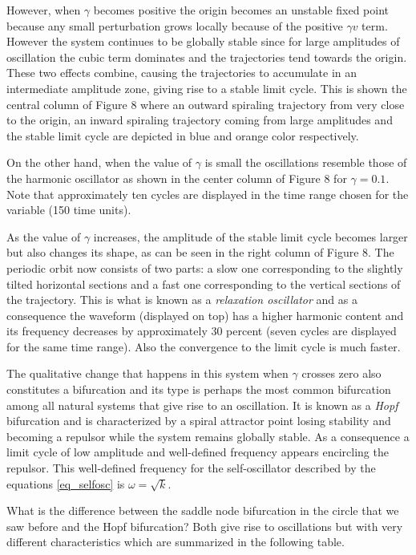 \documentclass{article}
\begin{document}
However, when $\gamma$ becomes positive the origin becomes an unstable fixed point because any small perturbation grows locally because of the positive $
\gamma v$ term. 
However the system continues to be globally stable since for large amplitudes of oscillation the cubic term dominates and the trajectories tend towards the origin. 
These two effects combine, causing the trajectories to accumulate in an intermediate amplitude zone, giving rise to a stable limit cycle. 
This is shown the central column of Figure 8 where an outward spiraling trajectory from very close to the origin, an inward spiraling trajectory coming from large amplitudes and the stable limit cycle are depicted in blue and orange color respectively. 
 
On the other hand, when the value of $\gamma$ is small the oscillations resemble those of the harmonic oscillator as shown in the center column of Figure 8 for $\gamma=0.1$. Note that approximately ten cycles are displayed in the time range chosen for the variable (150 time units).

As the value of $\gamma$ increases, the amplitude of the stable limit cycle becomes larger but also changes its shape, as can be seen in the right column of Figure 8. 
The periodic orbit now consists of two parts: a slow one corresponding to the slightly tilted horizontal sections and a fast one corresponding to the vertical sections of the trajectory. 
This is what is known as a {\em relaxation oscillator} and as a consequence the waveform (displayed on top) has a higher harmonic content and its frequency decreases by approximately 30 percent (seven cycles are displayed for the same time range). Also the convergence to the limit cycle is much faster.

The qualitative change that happens in this system when $\gamma$ crosses zero also constitutes a bifurcation and its type is perhaps the most common bifurcation among all natural systems that give rise to an oscillation. 
It is known as a {\em Hopf} bifurcation and is characterized by a spiral attractor point losing stability and becoming a repulsor while the system remains globally stable. As a consequence a limit cycle of low amplitude and well-defined frequency appears encircling the repulsor. This well-defined frequency for the self-oscillator described by the equations \ref{eq_selfosc} is $\omega=\sqrt{k}$.

What is the difference between the saddle node bifurcation in the circle that we saw before and the Hopf bifurcation? 
Both give rise to oscillations but with very different characteristics which are summarized in the following table.
\end{document}
